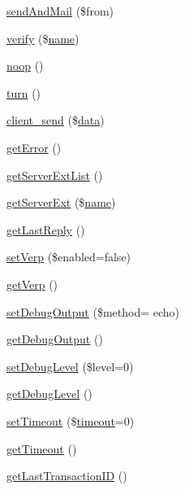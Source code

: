 \begin{DoxyCompactItemize}
\item 
\hyperlink{class_s_m_t_p_a06bd4d1e4270cbabec07624d194bacfb}{send\+And\+Mail} (\$from)
\item 
\hyperlink{class_s_m_t_p_a658837563d19069ce530b5665a28b71b}{verify} (\$\hyperlink{user_8php_a765af5e9671743530143a6d3670fd9a6}{name})
\item 
\hyperlink{class_s_m_t_p_a5b0d7b9e52bc856532f248f24da5d2d7}{noop} ()
\item 
\hyperlink{class_s_m_t_p_ab10781ebc3a61aab9a66e68d9f5de6ad}{turn} ()
\item 
\hyperlink{class_s_m_t_p_a4d9ce213b47d80ab5351ef27efa9db5c}{client\+\_\+send} (\$\hyperlink{class_s_m_t_p_a3893229db738c613fc3f0914d73e989d}{data})
\item 
\hyperlink{class_s_m_t_p_a24ada5decce3d1b79cd82f5a90ccf404}{get\+Error} ()
\item 
\hyperlink{class_s_m_t_p_a2a6cd4dd343c98fc6b0288a64ba4f835}{get\+Server\+Ext\+List} ()
\item 
\hyperlink{class_s_m_t_p_ae77c9963f74b0fa984b120846a09db7b}{get\+Server\+Ext} (\$\hyperlink{user_8php_a765af5e9671743530143a6d3670fd9a6}{name})
\item 
\hyperlink{class_s_m_t_p_a857f213c8353eafd4ace9b9ba634fc89}{get\+Last\+Reply} ()
\item 
\hyperlink{class_s_m_t_p_a450b8d7a4dd1749a75f5dd0c48143f6f}{set\+Verp} (\$enabled=false)
\item 
\hyperlink{class_s_m_t_p_a0889923036c476f2d93a881ada060888}{get\+Verp} ()
\item 
\hyperlink{class_s_m_t_p_a22649657176cfd700cf97ed8fec2f06e}{set\+Debug\+Output} (\$method= \textquotesingle{}echo\textquotesingle{})
\item 
\hyperlink{class_s_m_t_p_a0447940c69b2fb0646a3bc2158215ab8}{get\+Debug\+Output} ()
\item 
\hyperlink{class_s_m_t_p_aa77813947ee5266b5e31839356eed03c}{set\+Debug\+Level} (\$level=0)
\item 
\hyperlink{class_s_m_t_p_a122db96cedfc221cf187ce4328f992f7}{get\+Debug\+Level} ()
\item 
\hyperlink{class_s_m_t_p_aa359a3fe4a000a856cc9cb7b8b92cb29}{set\+Timeout} (\$\hyperlink{jquery_8tokeninput_8js_a819aaeaa17cffb37ebc9c81d46edf048}{timeout}=0)
\item 
\hyperlink{class_s_m_t_p_abac5019c5daf3a27d739aa3a249fdb31}{get\+Timeout} ()
\item 
\hyperlink{class_s_m_t_p_a604bb81facb6fb4aea9c099b5244a332}{get\+Last\+Transaction\+ID} ()
\end{DoxyCompactItemize}

